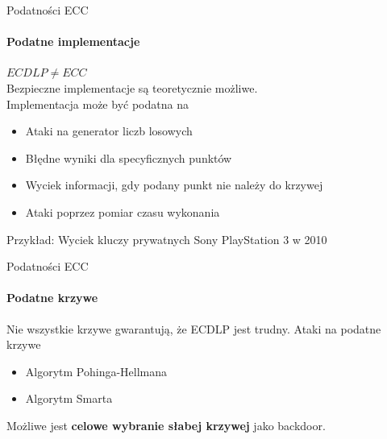 \begin{frame}{Podatności ECC}
\framesubtitle{Podatne implementacje}
\textbf{$ECDLP \neq ECC$} \\
\pause
Bezpieczne implementacje są teoretycznie możliwe. \\
\pause
Implementacja może być podatna na \cite{SafeCurves}
\begin{itemize}
    \item Ataki na generator liczb losowych
    \item Błędne wyniki dla specyficznych punktów
    \item Wyciek informacji, gdy podany punkt nie należy do krzywej
    \item Ataki poprzez pomiar czasu wykonania
\end{itemize}
\pause
\vspace{3mm}
Przykład: Wyciek kluczy prywatnych Sony PlayStation 3 w 2010 \cite{ConsoleHacking2010}

\end{frame}

\begin{frame}{Podatności ECC}
\framesubtitle{Podatne krzywe}
Nie wszystkie krzywe gwarantują, że ECDLP jest trudny.
Ataki na podatne krzywe \cite{WeakCurvesInEllipticCurveCryptography}
\begin{itemize}
    \item Algorytm Pohinga-Hellmana
    \item Algorytm Smarta
\end{itemize}
\pause
\vspace{3mm}
Możliwe jest \textbf{celowe wybranie słabej krzywej} jako backdoor.
\end{frame}

